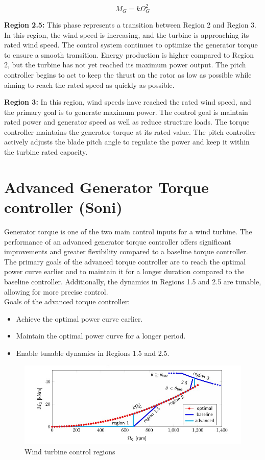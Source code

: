 \begin{equation}
	M_{G} = k\Omega_{G}^2
\end{equation}

\textbf{Region 2.5:} This phase represents a transition between Region 2 and Region 3. In this region, the wind speed is increasing, and the turbine is approaching its rated wind speed. The control system continues to optimize the generator torque to ensure a smooth transition. Energy production is higher compared to Region 2, but the turbine has not yet reached its maximum power output. The pitch controller begins to act to keep the thrust on the rotor as low as possible while aiming to reach the rated speed as quickly as possible.


\textbf{Region 3:} In this region, wind speeds have reached the rated wind speed, and the primary goal is to generate maximum power. The control goal is maintain rated power and generator speed as well as reduce structure loads. The torque controller maintains the generator torque at its rated value. The pitch controller actively adjusts the blade pitch angle to regulate the power and keep it within the turbine rated capacity.

\section{Advanced Generator Torque controller (Soni)}
Generator torque is one of the two main control inputs for a wind turbine. The performance of an advanced generator torque controller offers significant improvements and greater flexibility compared to a baseline torque controller. The primary goals of the advanced torque controller are to reach the optimal power curve earlier and to maintain it for a longer duration compared to the baseline controller. Additionally, the dynamics in Regions 1.5 and 2.5 are tunable, allowing for more precise control.
\\[16pt]
Goals of the advanced torque controller:

\begin{itemize}
	\item Achieve the optimal power curve earlier.
	\item Maintain the optimal power curve for a longer period.
	\item Enable tunable dynamics in Regions 1.5 and 2.5.
\end{itemize}

\begin{figure}[htbp]
	\centering
	\includegraphics[width=\textwidth]{Figures/Figure_3.jpg}
	\caption{Wind turbine control regions}
\end{figure}

